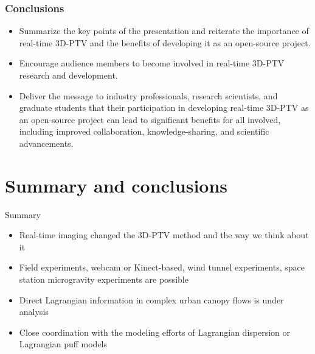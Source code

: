 \documentclass[aspectratio=43]{beamer}
\begin{document}

\begin{frame}
\frametitle{Conclusions}
\begin{itemize}
\item Summarize the key points of the presentation and reiterate the importance of real-time 3D-PTV and the benefits of developing it as an open-source project.
\item Encourage audience members to become involved in real-time 3D-PTV research and development.
\item Deliver the message to industry professionals, research scientists, and graduate students that their participation in developing real-time 3D-PTV as an open-source project can lead to significant benefits for all involved, including improved collaboration, knowledge-sharing, and scientific advancements.
\end{itemize}
\end{frame}




\section{Summary and conclusions}\label{sec:summary}

\begin{frame}{Summary}
\begin{itemize}
\item Real-time imaging changed the 3D-PTV method and the way we think about it
\item Field experiments, webcam or Kinect-based, wind tunnel experiments, space station microgravity experiments are possible
\item Direct Lagrangian information in complex urban canopy flows is under analysis
\item Close coordination with the modeling efforts of Lagrangian dispersion or Lagrangian puff models
\end{itemize}
\end{frame}
\end{document}
